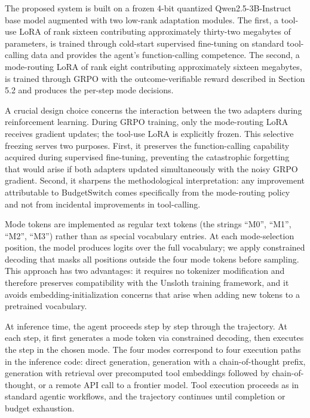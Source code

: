 \documentclass[11pt,a4paper]{article}
\begin{document}
The proposed system is built on a frozen 4-bit quantized Qwen2.5-3B-Instruct base model augmented with two low-rank adaptation modules. The first, a tool-use LoRA of rank sixteen contributing approximately thirty-two megabytes of parameters, is trained through cold-start supervised fine-tuning on standard tool-calling data and provides the agent's function-calling competence. The second, a mode-routing LoRA of rank eight contributing approximately sixteen megabytes, is trained through GRPO with the outcome-verifiable reward described in Section 5.2 and produces the per-step mode decisions.

A crucial design choice concerns the interaction between the two adapters during reinforcement learning. During GRPO training, only the mode-routing LoRA receives gradient updates; the tool-use LoRA is explicitly frozen. This selective freezing serves two purposes. First, it preserves the function-calling capability acquired during supervised fine-tuning, preventing the catastrophic forgetting that would arise if both adapters updated simultaneously with the noisy GRPO gradient. Second, it sharpens the methodological interpretation: any improvement attributable to BudgetSwitch comes specifically from the mode-routing policy and not from incidental improvements in tool-calling.

Mode tokens are implemented as regular text tokens (the strings ``M0'', ``M1'', ``M2'', ``M3'') rather than as special vocabulary entries. At each mode-selection position, the model produces logits over the full vocabulary; we apply constrained decoding that masks all positions outside the four mode tokens before sampling. This approach has two advantages: it requires no tokenizer modification and therefore preserves compatibility with the Unsloth training framework, and it avoids embedding-initialization concerns that arise when adding new tokens to a pretrained vocabulary.

At inference time, the agent proceeds step by step through the trajectory. At each step, it first generates a mode token via constrained decoding, then executes the step in the chosen mode. The four modes correspond to four execution paths in the inference code: direct generation, generation with a chain-of-thought prefix, generation with retrieval over precomputed tool embeddings followed by chain-of-thought, or a remote API call to a frontier model. Tool execution proceeds as in standard agentic workflows, and the trajectory continues until completion or budget exhaustion.
\end{document}
